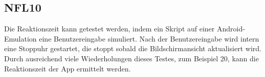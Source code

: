 \subsection*{NFL10}
Die Reaktionszeit kann getestet werden, indem ein Skript auf einer Android-Emulation eine Benutzereingabe simuliert.
Nach der Benutzereingabe wird intern eine Stoppuhr gestartet, die stoppt sobald die Bildschirmansicht aktualisiert wird.
Durch ausreichend viele Wiederholungen dieses Testes, zum Beispiel 20, kann die Reaktionszeit der App ermittelt werden.